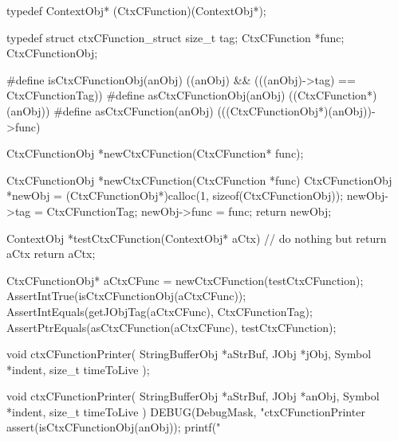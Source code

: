 \startCHeader
typedef ContextObj* (CtxCFunction)(ContextObj*);

typedef struct ctxCFunction_struct {
  size_t        tag;
  CtxCFunction *func;
} CtxCFunctionObj;

#define isCtxCFunctionObj(anObj) ((anObj) && (((anObj)->tag) == CtxCFunctionTag))
#define asCtxCFunctionObj(anObj) ((CtxCFunction*)(anObj))
#define asCtxCFunction(anObj)    (((CtxCFunctionObj*)(anObj))->func)
\stopCHeader

\startTestSuite[newCtxCFunction]

\startCHeader
CtxCFunctionObj *newCtxCFunction(CtxCFunction* func);
\stopCHeader

\startCCode
CtxCFunctionObj *newCtxCFunction(CtxCFunction *func) {
  CtxCFunctionObj *newObj =
    (CtxCFunctionObj*)calloc(1, sizeof(CtxCFunctionObj));
  newObj->tag  = CtxCFunctionTag;
  newObj->func = func;
  return newObj;
}
\stopCCode


\startCTest
  ContextObj *testCtxCFunction(ContextObj* aCtx){
    // do nothing but return aCtx
    return aCtx;
  }
  
  CtxCFunctionObj* aCtxCFunc = newCtxCFunction(testCtxCFunction);
  AssertIntTrue(isCtxCFunctionObj(aCtxCFunc));
  AssertIntEquals(getJObjTag(aCtxCFunc), CtxCFunctionTag);
  AssertPtrEquals(asCtxCFunction(aCtxCFunc), testCtxCFunction);
\stopCTest
\stopTestCase
\stopTestSuite

\startTestSuite[ctxCFunctionPrinter]

\startCHeader
void ctxCFunctionPrinter(
  StringBufferObj *aStrBuf,
  JObj            *jObj,
  Symbol          *indent,
  size_t           timeToLive
);
\stopCHeader

\startCCode
void ctxCFunctionPrinter(
  StringBufferObj *aStrBuf,
  JObj            *anObj,
  Symbol          *indent,
  size_t           timeToLive
) {
  DEBUG(DebugMask, "ctxCFunctionPrinter %
  assert(isCtxCFunctionObj(anObj));
  printf("%
}
\stopCCode

\skipTestCase
\stopTestSuite
